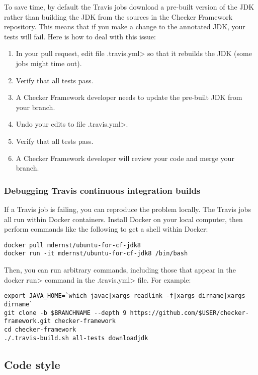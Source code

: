To save time, by default the Travis jobs download a pre-built version of
the JDK rather than building the JDK from the sources in the Checker
Framework repository.  This means that if you make a change to the
annotated JDK, your tests will fail.  Here is how to deal with this issue:
\begin{enumerate}
\item
In your pull request, edit file \<.travis.yml> so that it rebuilds
the JDK (some jobs might time out).
\item Verify that all tests pass.
\item A Checker Framework developer needs to update the pre-built JDK from
  your branch.
\item
  Undo your edits to file \<.travis.yml>.
\item Verify that all tests pass.
\item A Checker Framework developer will review your code and merge your branch.
\end{enumerate}


\subsubsection{Debugging Travis continuous integration builds\label{building-travis-debug}}

If a Travis job is failing, you can reproduce the problem locally.
The Travis jobs all run within Docker containers.
Install Docker on your local computer, then perform commands like the
following to get a shell within Docker:

\begin{Verbatim}
docker pull mdernst/ubuntu-for-cf-jdk8
docker run -it mdernst/ubuntu-for-cf-jdk8 /bin/bash
\end{Verbatim}

Then, you can run arbitrary commands, including those that appear in the
\<docker run> command in the \<.travis.yml> file.  For example:

\begin{Verbatim}
export JAVA_HOME=`which javac|xargs readlink -f|xargs dirname|xargs dirname`
git clone -b $BRANCHNAME --depth 9 https://github.com/$USER/checker-framework.git checker-framework
cd checker-framework
./.travis-build.sh all-tests downloadjdk
\end{Verbatim}


\subsection{Code style\label{code-style}}

